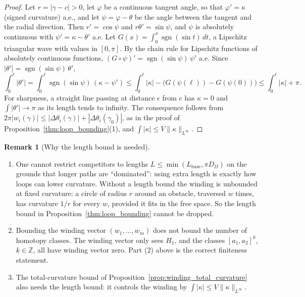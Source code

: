 \documentclass[11pt,reqno]{amsart}
\theoremstyle{definition}
\newtheorem{remark}[theorem]{Remark}
\newcommand{\Z}{\mathbb{Z}}
\numberwithin{equation}{section}
\begin{document}
\begin{proof}
Let $r = |\gamma - c| > 0$, let $\varphi$ be a continuous tangent angle, so that $\varphi' = \kappa$ (signed curvature) a.e., and let $\psi = \varphi - \theta$ be the angle between the tangent and the radial direction. Then $r' = \cos\psi$ and $r\theta' = \sin\psi$, and $\psi$ is absolutely continuous with $\psi' = \kappa - \theta'$ a.e. Let $G(x) = \int_0^x \operatorname{sgn}(\sin t)\,dt$, a Lipschitz triangular wave with values in $[0,\pi]$. By the chain rule for Lipschitz functions of absolutely continuous functions, $(G\circ\psi)' = \operatorname{sgn}(\sin\psi)\,\psi'$ a.e. Since $|\theta'| = \operatorname{sgn}(\sin\psi)\,\theta'$,
\begin{equation*}
\int_0^\ell |\theta'| = \int_0^\ell \operatorname{sgn}(\sin\psi)\,(\kappa - \psi') \le \int_0^\ell |\kappa| - \big(G(\psi(\ell)) - G(\psi(0))\big) \le \int_0^\ell |\kappa| + \pi.
\end{equation*}
For sharpness, a straight line passing at distance $\epsilon$ from $c$ has $\kappa = 0$ and $\int|\theta'| \to \pi$ as its length tends to infinity. The consequence follows from $2\pi|w_i(\gamma)| \le |\Delta\theta_i(\gamma)| + |\Delta\theta_i(\gamma_0)|$, as in the proof of Proposition~\ref{thm:loop_bounding}(1), and $\int|\kappa| \le V\|\kappa\|_{L^\infty}$.
\end{proof}

\begin{remark}[Why the length bound is needed]
\label{rem:old_cutoff}
\leavevmode
\begin{enumerate}
    \item[(a)] One cannot restrict competitors to lengths $L \le \min(L_{\mathrm{base}}, \pi D_\Omega)$ on the grounds that longer paths are ``dominated'': using extra length is exactly how loops can lower curvature. Without a length bound the winding is unbounded at fixed curvature: a circle of radius $r$ around an obstacle, traversed $w$ times, has curvature $1/r$ for every $w$, provided it fits in the free space. So the length bound in Proposition~\ref{thm:loop_bounding} cannot be dropped.
    \item[(b)] Bounding the winding vector $(w_1, \dots, w_m)$ does not bound the number of homotopy classes. The winding vector only sees $H_1$, and the classes $[a_1, a_2]^k$, $k \in \Z$, all have winding vector zero. Part (2) above is the correct finiteness statement.
    \item[(c)] The total-curvature bound of Proposition~\ref{prop:winding_total_curvature} also needs the length bound: it controls the winding by $\int|\kappa| \le V\|\kappa\|_{L^\infty}$.
\end{enumerate}
\end{remark}
\end{document}
